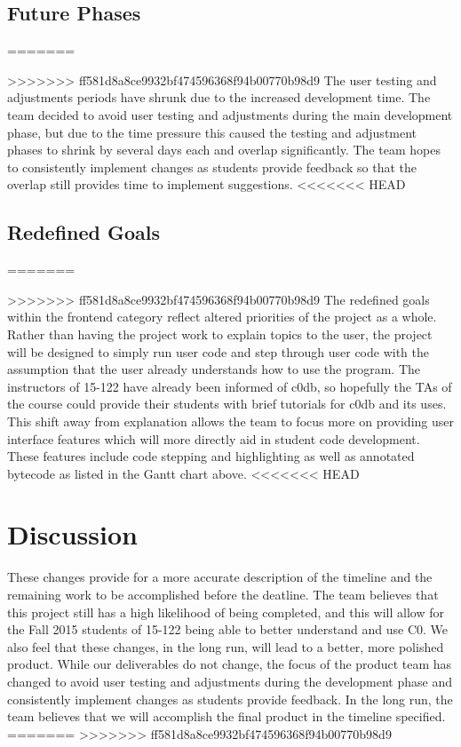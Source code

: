 \documentclass[11pt]{article}
\begin{document}
\subsection{Future Phases}
=======
\par
>>>>>>> ff581d8a8ce9932bf474596368f94b00770b98d9
The user testing and adjustments periods have shrunk due to the increased
development time. The team decided to avoid user testing and adjustments during
the main development phase, but due to the time pressure this caused the
testing and adjustment phases to shrink by several days each and overlap
significantly. The team hopes to consistently implement changes as students
provide feedback so that the overlap still provides time to implement
suggestions.
<<<<<<< HEAD
\subsection{Redefined Goals}
=======
\par
>>>>>>> ff581d8a8ce9932bf474596368f94b00770b98d9
The redefined goals within the frontend category reflect altered priorities of
the project as a whole. Rather than having the project work to explain topics
to the user, the project will be designed to simply run user code and step
through user code with the assumption that the user already understands how to
use the program. The instructors of 15-122 have already been informed of c0db,
so hopefully the TAs of the course could provide their students with brief
tutorials for c0db and its uses. This shift away from explanation allows the
team to focus more on providing user interface features which will more
directly aid in student code development. These features include code stepping
and highlighting as well as annotated bytecode as listed in the Gantt chart
above.
<<<<<<< HEAD
\section{Discussion}
These changes provide for a more accurate description of the timeline and the
remaining work to be accomplished before the deatline. The team believes that
this project still has a high likelihood of being completed, and this will
allow for the Fall 2015 students of 15-122 being able to better understand
and use C0. We also feel that these changes, in the long run, will lead to a
better, more polished product. While our deliverables do not change, the focus
of the product team has changed to avoid user testing and adjustments during
the development phase and consistently implement changes as students provide
feedback. In the long run, the team believes that we will accomplish the final
product in the timeline specified.
=======
>>>>>>> ff581d8a8ce9932bf474596368f94b00770b98d9
\end{document}

